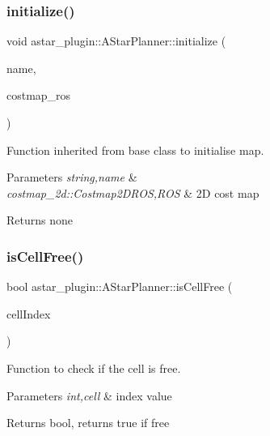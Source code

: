 \subsubsection{\texorpdfstring{initialize()}{initialize()}}
{\footnotesize\ttfamily void astar\+\_\+plugin\+::\+A\+Star\+Planner\+::initialize (\begin{DoxyParamCaption}\item[{std\+::string}]{name,  }\item[{costmap\+\_\+2d\+::\+Costmap2\+D\+R\+OS $\ast$}]{costmap\+\_\+ros }\end{DoxyParamCaption})}



Function inherited from base class to initialise map. 


\begin{DoxyParams}{Parameters}
{\em string,name} & \\
\hline
{\em costmap\+\_\+2d\+::\+Costmap2\+D\+R\+OS,R\+OS} & 2D cost map \\
\hline
\end{DoxyParams}
\begin{DoxyReturn}{Returns}
none 
\end{DoxyReturn}
\mbox{\label{classastar__plugin_1_1_a_star_planner_a29d81e8f4ac6191296d5c180be9ac8ae}} 
\subsubsection{\texorpdfstring{is\+Cell\+Free()}{isCellFree()}\hspace{0.1cm}{\footnotesize\ttfamily [1/2]}}
{\footnotesize\ttfamily bool astar\+\_\+plugin\+::\+A\+Star\+Planner\+::is\+Cell\+Free (\begin{DoxyParamCaption}\item[{int}]{cell\+Index }\end{DoxyParamCaption})}



Function to check if the cell is free. 


\begin{DoxyParams}{Parameters}
{\em int,cell} & index value \\
\hline
\end{DoxyParams}
\begin{DoxyReturn}{Returns}
bool, returns true if free 
\end{DoxyReturn}
\mbox{\label{classastar__plugin_1_1_a_star_planner_ae8f5105e002f679874c3d55815fe30ad}} 
